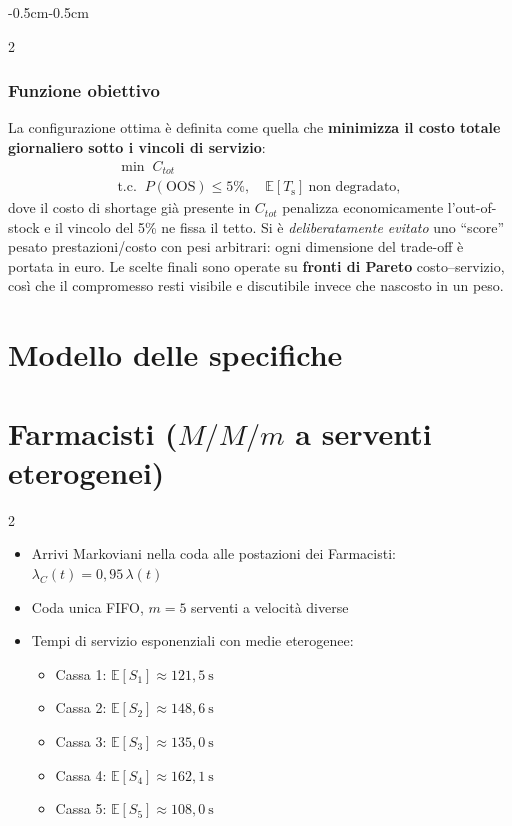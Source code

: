 \documentclass{article}
\begin{document}
\begin{adjustwidth}{-0.5cm}{-0.5cm}
\begin{multicols}{2}
\subsubsection*{Funzione obiettivo}
La configurazione ottima è definita come quella che \textbf{minimizza il costo totale
giornaliero sotto i vincoli di servizio}:
\begin{gather*}
\min\; C_{tot} \\
\text{t.c.}\;\; P(\text{OOS}) \le 5\%, \quad
\mathbb{E}[T_{\text{s}}]\ \text{non degradato},
\end{gather*}
dove il costo di shortage già presente in $C_{tot}$ penalizza economicamente l'out-of-stock e il
vincolo del 5\% ne fissa il tetto. Si è \emph{deliberatamente evitato} uno ``score'' pesato
prestazioni/costo con pesi arbitrari: ogni dimensione del trade-off è portata in euro. Le scelte finali sono operate su \textbf{fronti di Pareto} costo--servizio, così che il
compromesso resti visibile e discutibile invece che nascosto in un peso.
\end{multicols}

\newpage

\section{Modello delle specifiche}


\section*{Farmacisti ($M/M/m$ a serventi eterogenei)}
\begin{multicols}{2}
\begin{itemize}
    \item[\ding{112}] Arrivi Markoviani nella coda alle postazioni dei Farmacisti: $\lambda_C(t) = 0{,}95\,\lambda(t)$ 
    \item[\ding{112}] Coda unica FIFO, $m=5$ serventi a velocità diverse
    \item[\ding{112}] Tempi di servizio esponenziali con medie eterogenee:
        \begin{itemize}
    \item Cassa 1: $\mathbb{E}[S_1] \approx 121{,}5 \ \text{s}$
    \item Cassa 2: $\mathbb{E}[S_2] \approx 148{,}6 \ \text{s}$
    \item Cassa 3: $\mathbb{E}[S_3] \approx 135{,}0 \ \text{s}$
    \item Cassa 4: $\mathbb{E}[S_4] \approx 162{,}1 \ \text{s}$
    \item Cassa 5: $\mathbb{E}[S_5] \approx 108{,}0 \ \text{s}$
    \end{itemize}
\end{itemize}


\end{multicols}
\end{adjustwidth}
\end{document}
